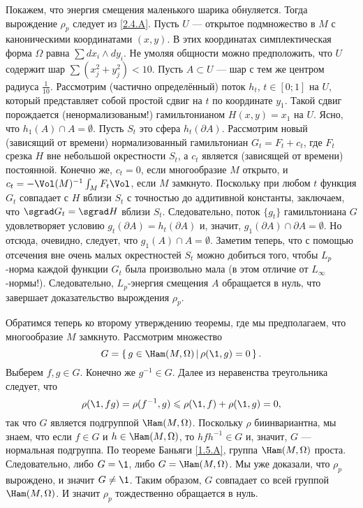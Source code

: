 Покажем, что энергия смещения маленького шарика обнуляется.
Тогда вырождение $\rho_p$ следует из \ref{2.4.A}.
Пусть $U$ — открытое подмножество в $M$ с каноническими координатами $(x, y)$.
В этих координатах симплектическая форма $\Omega$ равна $\sum dx_i\wedge dy_i$.
Не умоляя общности можно предположить, что $U$ содержит шар $\sum(x^2_j + y_j^2) <10$.
Пусть $A \subset U$ — шар с тем же центром радиуса $\tfrac1{10}$.
Рассмотрим (частично определённый) поток $h_t$, $t \in [0; 1]$ на $U$, который представляет собой простой сдвиг на $t$ по координате $y_1$.
Такой сдвиг порождается (ненормализованым!) гамильтонианом $H (x, y) = x_1$ на $U$.
Ясно, что $h_1 (A) \cap A = \emptyset$.
Пусть $S_t$ это сфера $h_t (\partial A)$.
Рассмотрим новый (зависящий от времени) нормализованный гамильтониан
$G_t = F_t + c_t$, где $F_t$ срезка $H$ вне небольшой окрестности $S_t$, а $c_t$ является (зависящей от времени) постоянной.
Конечно же, $c_t = 0$, если многообразие $M$ открыто, и $c_t = -\Vol(M)^{-1}\int_M F_t \Vol$, если $M$ замкнуто.
Поскольку при любом $t$ функция $G_t$ совпадает с $H$ вблизи $S_t$ с точностью до аддитивной константы, заключаем, что $\sgrad G_t = \sgrad H$ вблизи $S_t$.
Следовательно, поток $\{g_t\}$ гамильтониана $G$ удовлетворяет условию $g_t (\partial A) = h_t (\partial A)$ и, значит, $g_1 (\partial A) \cap \partial A = \emptyset$.
Но отсюда, очевидно, следует, что $g_1 (A) \cap A = \emptyset$.
Заметим теперь, что с помощью отсечения вне очень малых окрестностей $S_t$ можно добиться того, чтобы $L_p$-норма каждой функции $G_t$ была произвольно мала (в этом отличие от $L_\infty$-нормы!).
Следовательно, $L_p$-энергия смещения $A$ обращается в нуль, что завершает доказательство вырождения $\rho_p$.

Обратимся теперь ко второму утверждению теоремы, где мы предполагаем, что многообразие $M$ замкнуто.
Рассмотрим множество
\[G = \set{g \in \Ham (M, \Omega)}{\rho (\1, g) = 0}.\]
Выберем $f, g \in G$.
Конечно же $g^{-1} \in G$.
Далее из неравенства треугольника следует, что 
\[\rho (\1, f g) = \rho (f^{-1}, g) \le \rho (\1, f) + \rho (\1, g) = 0,\]
так что $G$ является подгруппой $\Ham (M, \Omega)$.
Поскольку $\rho$ биинвариантна, мы знаем, что если $f \in G$ и $h \in \Ham (M, \Omega)$, то $hf h^{-1} \in G$ и, значит, $G$ — нормальная подгруппа.
По теореме Баньяги \ref{1.5.A}, группа $\Ham (M, \Omega)$ проста.
Следовательно, либо $G = {\1}$, либо $G = \Ham (M, \Omega)$.
Мы уже доказали, что $\rho_p$ вырождено, и значит $G \ne {\1}$.
Таким образом, $G$ совпадает со всей группой $\Ham (M, \Omega)$.
И значит $\rho_p$ тождественно обращается в нуль.
\qeds

